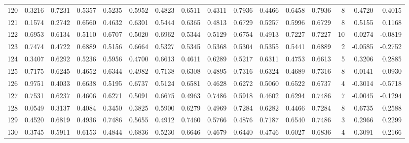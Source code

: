 \begin{tabular}{lrrrrrrrrrrrrrrr}
120 &      0.3216 &  0.7231 &  0.5357 &  0.5235 &  0.5952 &  0.4823 &  0.6511 &  0.4311 &  0.7936 &  0.4466 &   0.6458 &     0.7936 &      8 &                    0.4720 &                     0.4015 \\
121 &      0.1574 &  0.2742 &  0.6560 &  0.4632 &  0.6301 &  0.5444 &  0.6365 &  0.4813 &  0.6729 &  0.5257 &   0.5996 &     0.6729 &      8 &                    0.5155 &                     0.1168 \\
122 &      0.6953 &  0.6134 &  0.5110 &  0.6707 &  0.5020 &  0.6962 &  0.5344 &  0.5129 &  0.6754 &  0.4913 &   0.7227 &     0.7227 &     10 &                    0.0274 &                    -0.0819 \\
123 &      0.7474 &  0.4722 &  0.6889 &  0.5156 &  0.6664 &  0.5327 &  0.5345 &  0.5368 &  0.5304 &  0.5355 &   0.5441 &     0.6889 &      2 &                   -0.0585 &                    -0.2752 \\
124 &      0.3407 &  0.6292 &  0.5236 &  0.5956 &  0.4700 &  0.6613 &  0.4611 &  0.6289 &  0.5217 &  0.6311 &   0.4753 &     0.6613 &      5 &                    0.3206 &                     0.2885 \\
125 &      0.7175 &  0.6245 &  0.4652 &  0.6344 &  0.4982 &  0.7138 &  0.6308 &  0.4895 &  0.7316 &  0.6324 &   0.4689 &     0.7316 &      8 &                    0.0141 &                    -0.0930 \\
126 &      0.9751 &  0.4033 &  0.6638 &  0.5195 &  0.6737 &  0.5124 &  0.6581 &  0.4628 &  0.6272 &  0.5060 &   0.6522 &     0.6737 &      4 &                   -0.3014 &                    -0.5718 \\
127 &      0.7531 &  0.6237 &  0.4606 &  0.6271 &  0.5091 &  0.6675 &  0.4963 &  0.7486 &  0.5918 &  0.4602 &   0.6294 &     0.7486 &      7 &                   -0.0045 &                    -0.1294 \\
128 &      0.0549 &  0.3137 &  0.4084 &  0.3450 &  0.3825 &  0.5900 &  0.6279 &  0.4969 &  0.7284 &  0.6282 &   0.4466 &     0.7284 &      8 &                    0.6735 &                     0.2588 \\
129 &      0.4520 &  0.6819 &  0.4936 &  0.7486 &  0.5655 &  0.4912 &  0.7460 &  0.5766 &  0.4876 &  0.7187 &   0.6540 &     0.7486 &      3 &                    0.2966 &                     0.2299 \\
130 &      0.3745 &  0.5911 &  0.6153 &  0.4844 &  0.6836 &  0.5230 &  0.6646 &  0.4679 &  0.6440 &  0.4746 &   0.6027 &     0.6836 &      4 &                    0.3091 &                     0.2166 \\

\end{tabular}
